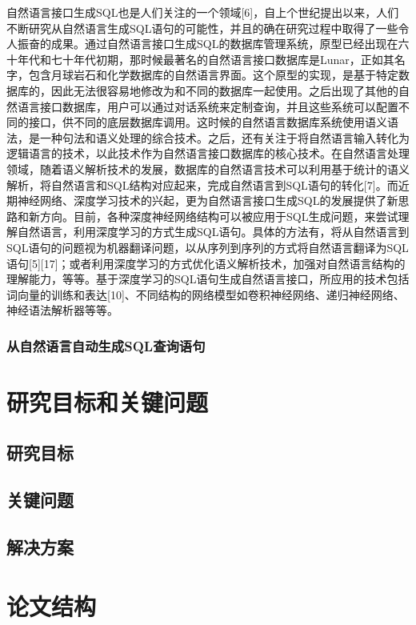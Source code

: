 自然语言接口生成SQL也是人们关注的一个领域[6]，自上个世纪提出以来，人们不断研究从自然语言生成SQL语句的可能性，并且的确在研究过程中取得了一些令人振奋的成果。通过自然语言接口生成SQL的数据库管理系统，原型已经出现在六十年代和七十年代初期，那时候最著名的自然语言接口数据库是Lunar，正如其名字，包含月球岩石和化学数据库的自然语言界面。这个原型的实现，是基于特定数据库的，因此无法很容易地修改为和不同的数据库一起使用。之后出现了其他的自然语言接口数据库，用户可以通过对话系统来定制查询，并且这些系统可以配置不同的接口，供不同的底层数据库调用。这时候的自然语言数据库系统使用语义语法，是一种句法和语义处理的综合技术。之后，还有关注于将自然语言输入转化为逻辑语言的技术，以此技术作为自然语言接口数据库的核心技术。在自然语言处理领域，随着语义解析技术的发展，数据库的自然语言技术可以利用基于统计的语义解析，将自然语言和SQL结构对应起来，完成自然语言到SQL语句的转化[7]。而近期神经网络、深度学习技术的兴起，更为自然语言接口生成SQL的发展提供了新思路和新方向。目前，各种深度神经网络结构可以被应用于SQL生成问题，来尝试理解自然语言，利用深度学习的方式生成SQL语句。具体的方法有，将从自然语言到SQL语句的问题视为机器翻译问题，以从序列到序列的方式将自然语言翻译为SQL语句[5][17]；或者利用深度学习的方式优化语义解析技术，加强对自然语言结构的理解能力，等等。基于深度学习的SQL语句生成自然语言接口，所应用的技术包括词向量的训练和表达[10]、不同结构的网络模型如卷积神经网络、递归神经网络、神经语法解析器等等。


\label{intro:interactionsql}
\subsubsection{从自然语言自动生成SQL查询语句}
\label{intro:enl2sql}
\section{研究目标和关键问题}
\label{intro:targetquestion}
\subsection{研究目标}
\label{intro:target}
\subsection{关键问题}
\label{intro:question}
\subsection{解决方案}
\label{intro:solution}
\section{论文结构}
\label{intro:structure}
